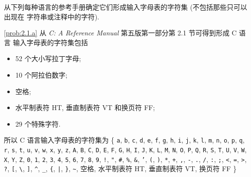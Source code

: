 \documentclass[boxes]{homework}
\begin{document}
\begin{problem}
从下列每种语言的参考手册确定它们形成输入字母表的字符集 (不包括那些只可以出现在
字符串或注释中的字符).
\end{problem}
\begin{solution}
    \ref{prob:2.1.a}
    从 \textit{C: A Reference Manual} 第五版第一部分第 2.1 节可得到形成 C 语言
    输入字母表的字符集包括
    \begin{itemize}
        \item 52 个大小写拉丁字母;
        \item 10 个阿拉伯数字;
        \item 空格;
        \item 水平制表符 HT, 垂直制表符 VT 和换页符 FF\@;
        \item 29 个特殊字符.
    \end{itemize}
    所以 C 语言输入字母表的字符集为 \{ \texttt{a}, \texttt{b}, \texttt{c},
    \texttt{d}, \texttt{e}, \texttt{f}, \texttt{g}, \texttt{h}, \texttt{i},
    \texttt{j}, \texttt{k}, \texttt{l}, \texttt{m}, \texttt{n}, \texttt{o},
    \texttt{p}, \texttt{q}, \texttt{r}, \texttt{s}, \texttt{t}, \texttt{u},
    \texttt{v}, \texttt{w}, \texttt{x}, \texttt{y}, \texttt{z}, \texttt{A},
    \texttt{B}, \texttt{C}, \texttt{D}, \texttt{E}, \texttt{F}, \texttt{G},
    \texttt{H}, \texttt{I}, \texttt{J}, \texttt{K}, \texttt{L}, \texttt{M},
    \texttt{N}, \texttt{O}, \texttt{P}, \texttt{Q}, \texttt{R}, \texttt{S},
    \texttt{T}, \texttt{U}, \texttt{V}, \texttt{W}, \texttt{X}, \texttt{Y},
    \texttt{Z}, \texttt{0}, \texttt{1}, \texttt{2}, \texttt{3}, \texttt{4},
    \texttt{5}, \texttt{6}, \texttt{7}, \texttt{8}, \texttt{9}, \texttt{!},
    \texttt{"}, \texttt{\#}, \texttt{\%}, \texttt{\&}, \texttt{'}, \texttt{(},
    \texttt{)}, \texttt{*}, \texttt{+}, \texttt{,}, \texttt{-}, \texttt{.},
    \texttt{/}, \texttt{:}, \texttt{;}, \texttt{<}, \texttt{=}, \texttt{>},
    \texttt{?}, \texttt{[}, \texttt{\textbackslash}, \texttt{]}, \texttt{\^{}},
    \texttt{\_}, \texttt{\{}, \texttt{|}, \texttt{\}}, \texttt{\textasciitilde},
    空格, 水平制表符 HT, 垂直制表符 VT, 换页符 FF \}
\end{solution}
\end{document}
